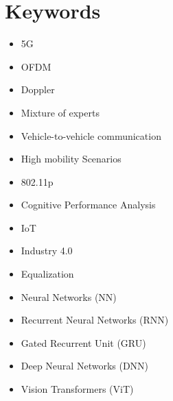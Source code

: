 \section{Keywords}

\begin{itemize}
    \item 5G
    \item OFDM
    \item Doppler
    \item Mixture of experts
    \item Vehicle-to-vehicle communication
    \item High mobility Scenarios
    \item 802.11p
    \item Cognitive Performance Analysis
    \item IoT
    \item Industry 4.0
    \item Equalization
    \item Neural Networks (NN)
    \item Recurrent Neural Networks (RNN)
    \item Gated Recurrent Unit (GRU)
    \item Deep Neural Networks (DNN)
    \item Vision Transformers (ViT)
\end{itemize}
